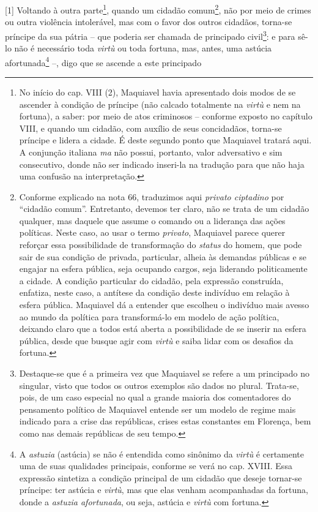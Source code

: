 {[}1{]} Voltando à outra parte\footnote{No início do cap. VIII (2),
  Maquiavel havia apresentado dois modos de se ascender à condição de
  príncipe (não calcado totalmente na \emph{virtù} e nem na fortuna), a
  saber: por meio de atos criminosos -- conforme exposto no capítulo
  VIII, e quando um cidadão, com auxílio de seus concidadãos, torna-se
  príncipe e lidera a cidade. É deste segundo ponto que Maquiavel
  tratará aqui. A conjunção italiana \emph{ma} não possui, portanto,
  valor adversativo e sim consecutivo, donde não ser indicado inseri-la
  na tradução para que não haja uma confusão na interpretação.}, quando
um cidadão comum\footnote{Conforme explicado na nota 66, traduzimos aqui
  \emph{privato ciptadino} por ``cidadão comum''. Entretanto, devemos
  ter claro, não se trata de um cidadão qualquer, mas daquele que assume
  o comando ou a liderança das ações políticas. Neste caso, ao usar o
  termo \emph{privato}, Maquiavel parece querer reforçar essa
  possibilidade de transformação do \emph{status} do homem, que pode
  sair de sua condição de privada, particular, alheia às demandas
  públicas e se engajar na esfera pública, seja ocupando cargos, seja
  liderando politicamente a cidade. A condição particular do cidadão,
  pela expressão construída, enfatiza, neste caso, a antítese da
  condição deste indivíduo em relação à esfera pública. Maquiavel dá a
  entender que escolheu o indivíduo mais avesso ao mundo da política
  para transformá-lo em modelo de ação política, deixando claro que a
  todos está aberta a possibilidade de se inserir na esfera pública,
  desde que busque agir com \emph{virtù} e saiba lidar com os desafios
  da fortuna.}, não por meio de crimes ou outra violência intolerável,
mas com o favor dos outros cidadãos, torna-se príncipe da sua pátria --
que poderia ser chamada de principado civil\footnote{Destaque-se que é a
  primeira vez que Maquiavel se refere a um principado no singular,
  visto que todos os outros exemplos são dados no plural. Trata-se,
  pois, de um caso especial no qual a grande maioria dos comentadores do
  pensamento político de Maquiavel entende ser um modelo de regime mais
  indicado para a crise das repúblicas, crises estas constantes em
  Florença, bem como nas demais repúblicas de seu tempo.}: e para sê-lo
não é necessário toda \emph{virtù} ou toda fortuna, mas, antes, uma
astúcia afortunada\footnote{A \emph{astuzia} (astúcia) se não é
  entendida como sinônimo da \emph{virtù} é certamente uma de suas
  qualidades principais, conforme se verá no cap. XVIII. Essa expressão
  sintetiza a condição principal de um cidadão que deseje tornar-se
  príncipe: ter astúcia e \emph{virtù}, mas que elas venham acompanhadas
  da fortuna, donde a \emph{astuzia afortunada}, ou seja, astúcia e
  \emph{virtù} com fortuna.} --, digo que se ascende a este principado
